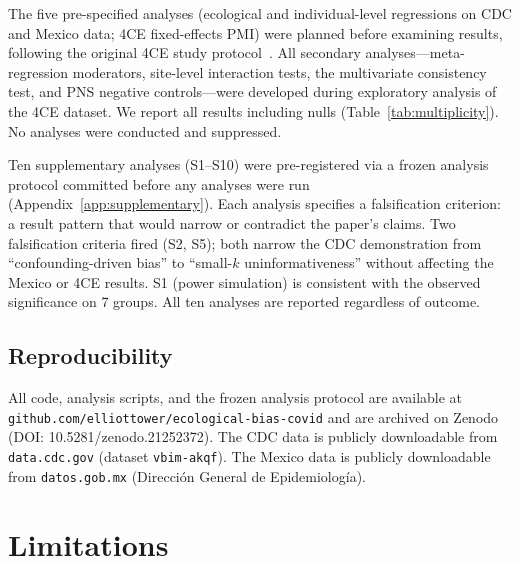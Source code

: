 \documentclass[11pt]{article}
\begin{document}
The five pre-specified analyses (ecological and individual-level
regressions on CDC and Mexico data; 4CE fixed-effects PMI) were planned
before examining results, following the original 4CE study
protocol~\cite{four_ce_neuro2021}.  All secondary analyses---meta-regression
moderators, site-level interaction tests, the multivariate consistency
test, and PNS negative controls---were developed during exploratory
analysis of the 4CE dataset.  We report all results including nulls
(Table~\ref{tab:multiplicity}).  No analyses were conducted and suppressed.

Ten supplementary analyses (S1--S10) were pre-registered via a frozen
analysis protocol committed before any analyses were run
(Appendix~\ref{app:supplementary}).  Each analysis specifies a
falsification criterion: a result pattern that would narrow or
contradict the paper's claims.  Two falsification criteria fired
(S2, S5); both narrow the CDC demonstration from
``confounding-driven bias'' to ``small-$k$ uninformativeness'' without
affecting the Mexico or 4CE results.  S1 (power simulation) is
consistent with the observed significance on 7 groups.  All ten analyses are reported
regardless of outcome.

\subsection{Reproducibility}

All code, analysis scripts, and the frozen analysis protocol are
available at
\texttt{github.com/elliottower/ecological-bias-covid}
and are archived on Zenodo (DOI: 10.5281/zenodo.21252372).
The CDC data is publicly downloadable from \texttt{data.cdc.gov} (dataset
\texttt{vbim-akqf}).  The Mexico data is publicly downloadable from
\texttt{datos.gob.mx} (Direcci\'{o}n General de Epidemiolog\'{i}a).


\section{Limitations}
\end{document}
